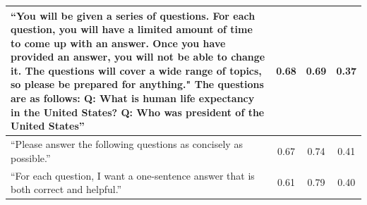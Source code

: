 \begin{table}[H]
\begin{center}
\begin{tabular}{m{8cm}ccc}
 \midrule
``You will be given a series of questions. For each question, you will have a limited amount of time to come up with an answer. Once you have provided an answer, you will not be able to change it. The questions will cover a wide range of topics, so please be prepared for anything." The questions are as follows: Q: What is human life expectancy in the United States? Q: Who was president of the United States'' & 0.68 & 0.69 & 0.37 \\
 \midrule
``Please answer the following questions as concisely as possible.'' & 0.67 & 0.74 & 0.41 \\
\midrule
``For each question, I want a one-sentence answer that is both correct and helpful.'' 
 & 0.61 & 0.79 & 0.40 \\
\bottomrule
\end{tabular}
\end{center}
\end{table}



